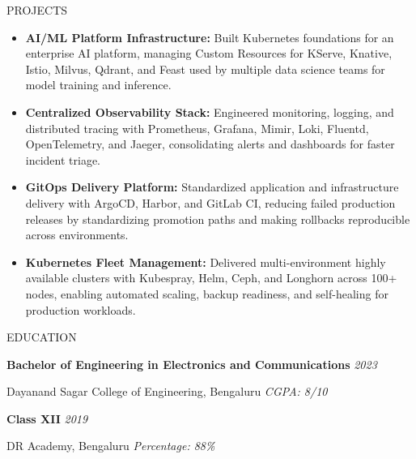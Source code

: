 \documentclass{resume}
\begin{document}
\begin{rSection}{PROJECTS}

\begin{itemize}
\itemsep -3pt
\parsep 0pt
\partopsep 0pt
\topsep 2pt

\item \textbf{AI/ML Platform Infrastructure:} Built Kubernetes foundations for an enterprise AI platform, managing Custom Resources for KServe, Knative, Istio, Milvus, Qdrant, and Feast used by multiple data science teams for model training and inference.

\item \textbf{Centralized Observability Stack:} Engineered monitoring, logging, and distributed tracing with Prometheus, Grafana, Mimir, Loki, Fluentd, OpenTelemetry, and Jaeger, consolidating alerts and dashboards for faster incident triage.

\item \textbf{GitOps Delivery Platform:} Standardized application and infrastructure delivery with ArgoCD, Harbor, and GitLab CI, reducing failed production releases by standardizing promotion paths and making rollbacks reproducible across environments.

\item \textbf{Kubernetes Fleet Management:} Delivered multi-environment highly available clusters with Kubespray, Helm, Ceph, and Longhorn across 100+ nodes, enabling automated scaling, backup readiness, and self-healing for production workloads.

\end{itemize}

\end{rSection}


\begin{rSection}{EDUCATION}

\textbf{Bachelor of Engineering in Electronics and Communications}
\hfill \textit{2023}

Dayanand Sagar College of Engineering, Bengaluru
\hfill \textit{CGPA: 8/10}

\textbf{Class XII}
\hfill \textit{2019}

DR Academy, Bengaluru
\hfill \textit{Percentage: 88\%}

\end{rSection}
\end{document}
